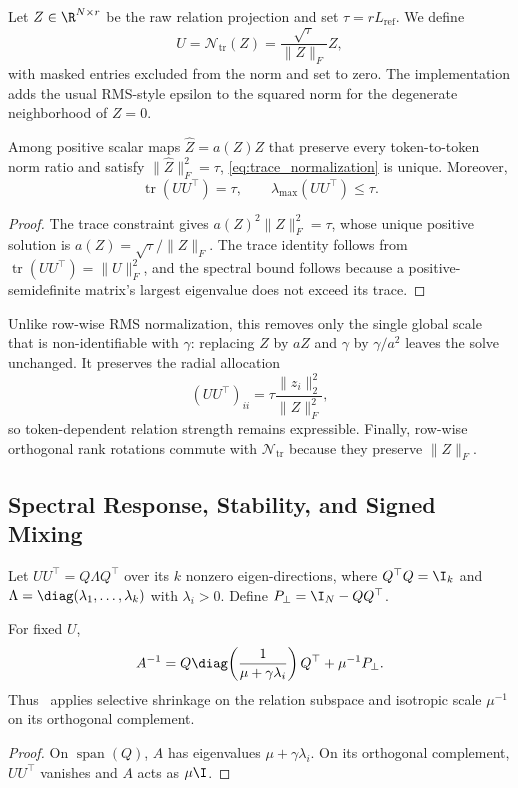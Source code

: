 Let $Z\in\R^{N\times r}$ be the raw relation projection and set $\tau=rL_{\mathrm{ref}}$. We define
\begin{equation}
  U=\mathcal N_{\mathrm{tr}}(Z)
  =\frac{\sqrt{\tau}}{\lVert Z\rVert_F}Z,
  \label{eq:trace_normalization}
\end{equation}
with masked entries excluded from the norm and set to zero. The implementation adds the usual RMS-style epsilon to the squared norm for the degenerate neighborhood of $Z=0$.

\begin{proposition}
Among positive scalar maps $\widehat Z=a(Z)Z$ that preserve every token-to-token norm ratio and satisfy $\lVert\widehat Z\rVert_F^2=\tau$, \cref{eq:trace_normalization} is unique. Moreover,
\begin{equation}
  \operatorname{tr}(UU^\top)=\tau,
  \qquad
  \lambda_{\max}(UU^\top)\leq\tau.
\end{equation}
\end{proposition}
\begin{proof}
The trace constraint gives $a(Z)^2\lVert Z\rVert_F^2=\tau$, whose unique positive solution is $a(Z)=\sqrt{\tau}/\lVert Z\rVert_F$. The trace identity follows from $\operatorname{tr}(UU^\top)=\lVert U\rVert_F^2$, and the spectral bound follows because a positive-semidefinite matrix's largest eigenvalue does not exceed its trace.
\end{proof}

Unlike row-wise RMS normalization, this removes only the single global scale that is non-identifiable with $\gamma$: replacing $Z$ by $aZ$ and $\gamma$ by $\gamma/a^2$ leaves the solve unchanged. It preserves the radial allocation
\[
  (UU^\top)_{ii}
  =\tau\frac{\lVert z_i\rVert_2^2}{\lVert Z\rVert_F^2},
\]
so token-dependent relation strength remains expressible. Finally, row-wise orthogonal rank rotations commute with $\mathcal N_{\mathrm{tr}}$ because they preserve $\lVert Z\rVert_F$.

\subsection{Spectral Response, Stability, and Signed Mixing}

Let $UU^\top=Q\Lambda Q^\top$ over its $k$ nonzero eigen-directions, where $Q^\top Q=\I_k$ and $\Lambda=\diag(\lambda_1,\ldots,\lambda_k)$ with $\lambda_i>0$. Define $P_\perp=\I_N-QQ^\top$.

\begin{proposition}
\label{prop:spectrum}
For fixed $U$,
\begin{equation}
  A^{-1}
  =Q\diag\!\left(\frac{1}{\mu+\gamma\lambda_i}\right)Q^\top
  +\mu^{-1}P_\perp.
  \label{eq:spectral_filter}
\end{equation}
Thus \LSSO\ applies selective shrinkage on the relation subspace and isotropic scale $\mu^{-1}$ on its orthogonal complement.
\end{proposition}
\begin{proof}
On $\operatorname{span}(Q)$, $A$ has eigenvalues $\mu+\gamma\lambda_i$. On its orthogonal complement, $UU^\top$ vanishes and $A$ acts as $\mu\I$.
\end{proof}

